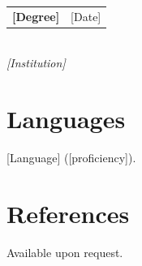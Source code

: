 \documentclass[11pt,a4paper]{article}
\makeatletter
\newcommand{\cventry}[4]{%
  \noindent\begin{tabularx}{\linewidth}{@{}X r@{}}
    \textbf{#1} & #2 \\
  \end{tabularx}%
  \\[1pt]
  {\itshape #3\ifthenelse{\equal{#4}{}}{}{, #4}}\par
}
\makeatother
\begin{document}
\cventry{[Degree]}{[Date]}{[Institution]}{}


\section{Languages}
[Language] ([proficiency]).


\section{References}
Available upon request.
\end{document}
